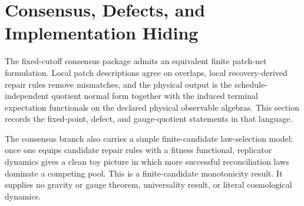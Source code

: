 \section{Consensus, Defects, and Implementation Hiding}

The fixed-cutoff consensus package admits an equivalent finite patch-net formulation. Local patch descriptions agree on
overlaps, local recovery-derived repair rules remove mismatches, and the physical output is the
schedule-independent quotient normal form together with the induced terminal expectation
functionals on the declared physical observable algebras. This section records the fixed-point,
defect, and gauge-quotient statements in that language.

The consensus branch also carries a simple finite-candidate law-selection model: once one equips
candidate repair rules with a fitness functional, replicator dynamics gives a clean toy picture in
which more successful reconciliation laws dominate a competing pool. This is
a finite-candidate monotonicity result. It supplies no gravity or gauge
theorem, universality result, or literal cosmological dynamics.

